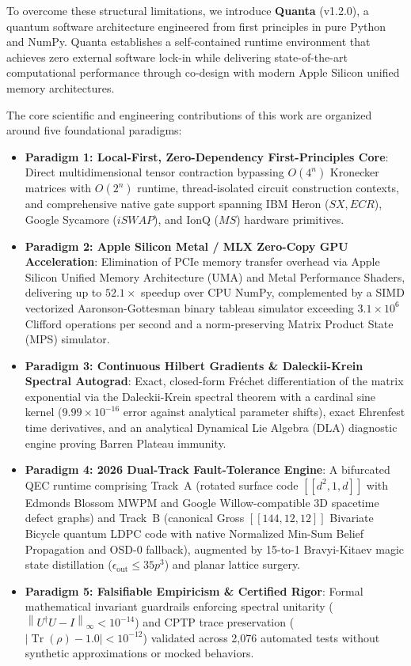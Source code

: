 \documentclass[aps,prx,twocolumn,superscriptaddress,nofootinbib]{revtex4-2}
\newcommand{\norm}[1]{\left\|#1\right\|}
\newcommand{\Tr}{\operatorname{Tr}}
\begin{document}
To overcome these structural limitations, we introduce \textbf{Quanta} (v1.2.0), a quantum software architecture engineered from first principles in pure Python and NumPy. Quanta establishes a self-contained runtime environment that achieves zero external software lock-in while delivering state-of-the-art computational performance through co-design with modern Apple Silicon unified memory architectures.

The core scientific and engineering contributions of this work are organized around five foundational paradigms:
\begin{itemize}
    \item \textbf{Paradigm 1: Local-First, Zero-Dependency First-Principles Core}: Direct multidimensional tensor contraction bypassing $O(4^n)$ Kronecker matrices with $O(2^n)$ runtime, thread-isolated circuit construction contexts, and comprehensive native gate support spanning IBM Heron ($SX, ECR$), Google Sycamore ($iSWAP$), and IonQ ($MS$) hardware primitives.
    \item \textbf{Paradigm 2: Apple Silicon Metal / MLX Zero-Copy GPU Acceleration}: Elimination of PCIe memory transfer overhead via Apple Silicon Unified Memory Architecture (UMA) and Metal Performance Shaders, delivering up to $52.1\times$ speedup over CPU NumPy, complemented by a SIMD vectorized Aaronson-Gottesman binary tableau simulator exceeding $3.1 \times 10^6$ Clifford operations per second and a norm-preserving Matrix Product State (MPS) simulator.
    \item \textbf{Paradigm 3: Continuous Hilbert Gradients \& Daleckii-Krein Spectral Autograd}: Exact, closed-form Fr\'echet differentiation of the matrix exponential via the Daleckii-Krein spectral theorem with a cardinal sine kernel ($9.99 \times 10^{-16}$ error against analytical parameter shifts), exact Ehrenfest time derivatives, and an analytical Dynamical Lie Algebra (DLA) diagnostic engine proving Barren Plateau immunity.
    \item \textbf{Paradigm 4: 2026 Dual-Track Fault-Tolerance Engine}: A bifurcated QEC runtime comprising Track~A (rotated surface code $[[d^2, 1, d]]$ with Edmonds Blossom MWPM and Google Willow-compatible 3D spacetime defect graphs) and Track~B (canonical Gross $[[144, 12, 12]]$ Bivariate Bicycle quantum LDPC code with native Normalized Min-Sum Belief Propagation and OSD-0 fallback), augmented by 15-to-1 Bravyi-Kitaev magic state distillation ($\epsilon_{\text{out}} \le 35 p^3$) and planar lattice surgery.
    \item \textbf{Paradigm 5: Falsifiable Empiricism \& Certified Rigor}: Formal mathematical invariant guardrails enforcing spectral unitarity ($\norm{U^\dagger U - I}_\infty < 10^{-14}$) and CPTP trace preservation ($|\Tr(\rho) - 1.0| < 10^{-12}$) validated across 2,076 automated tests without synthetic approximations or mocked behaviors.
\end{itemize}
\end{document}
